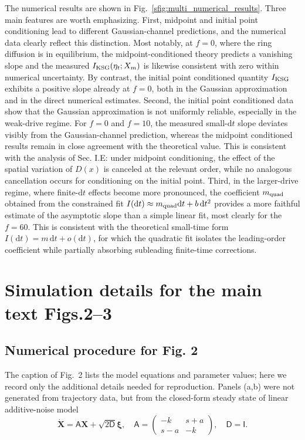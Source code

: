 \documentclass[
 longbibliography,
 twocolumn,
 superscriptaddress,
 amsmath,
 amssymb,
 amsthm,
 amsfonts,
 prl,
 floatfix,
]{revtex4-2}
\newcommand{\matbf}[1]{\boldsymbol{\mathsf{#1}}}
\begin{document}
\begin{widetext}
The numerical results are shown in Fig.~\ref{sfig:multi_numerical_results}. Three main features are worth emphasizing. First, midpoint and initial point conditioning lead to different Gaussian-channel predictions, and the numerical data clearly reflect this distinction. Most notably, at $f=0$, where the ring diffusion is in equilibrium, the midpoint-conditioned theory predicts a vanishing slope and the measured $I_{\rm KSG}(\eta_t;X_m)$ is likewise consistent with zero within numerical uncertainty. By contrast, the initial point conditioned quantity $I_{\rm KSG}$ exhibits a positive slope already at $f=0$, both in the Gaussian approximation and in the direct numerical estimates. Second, the initial point conditioned data show that the Gaussian approximation is not uniformly reliable, especially in the weak-drive regime. For $f=0$ and $f=10$, the measured small-$\mathrm dt$ slope deviates visibly from the Gaussian-channel prediction, whereas the midpoint conditioned results remain in close agreement with the theoretical value. This is consistent with the analysis of Sec. I.E: under midpoint conditioning, the effect of the spatial variation of $D(x)$ is canceled at the relevant order, while no analogous cancellation occurs for conditioning on the initial point. Third, in the larger-drive regime, where finite-$\mathrm dt$ effects become more pronounced, the coefficient $m_{\rm quad}$ obtained from the constrained fit $I(\mathrm dt)\approx m_{\rm quad}\mathrm dt+b\,\mathrm dt^2$ provides a more faithful estimate of the asymptotic slope than a simple linear fit, most clearly for the $f=60$. This is consistent with the theoretical small-time form $I(\mathrm dt)=m\,\mathrm dt+o(\mathrm dt)$, for which the quadratic fit isolates the leading-order coefficient while partially absorbing subleading finite-time corrections.

\section{Simulation details for the main text Figs.2--3}
\vspace*{-0.6\baselineskip}

\subsection{Numerical procedure for Fig. 2}
\vspace*{-0.6\baselineskip}

The caption of Fig.~2 lists the model equations and parameter values; here we record only the additional details needed for reproduction. Panels (a,b) were not generated from trajectory data, but from the closed-form steady state of linear additive-noise model
\begin{equation}
    \dot{\bm X}=\matbf A\bm X+\sqrt{2\matbf D}\bm\xi,
    \quad
    \matbf A=
    \begin{pmatrix}
        -k & s+a \\
        s-a & -k
    \end{pmatrix},
    \quad
    \matbf D=\matbf I.
    \label{seq:linear_Langevin_fig2}
\end{equation}


\end{widetext}
\end{document}
